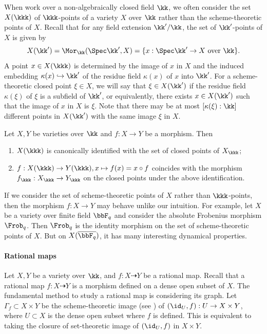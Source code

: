 When work over a non-algebraically closed field $\kk$, we often consider the set $X(\kkk)$ of $\kkk$-points of a variety $X$ over $\kk$ rather than the scheme-theoretic points of $X$.
Recall that for any field extension $\kk'/\kk$, the set of $\kk'$-points of $X$ is given by
\[ X(\kk') = \Mor_{\kk}(\Spec \kk', X) = \{ x: \Spec \kk' \to X \text{ over } \kk \}. \]
A point $x \in X(\kkk)$ is determined by the image of $x$ in $X$ and the induced embedding $\kappa(x) \hookrightarrow \kk'$ of the residue field $\kappa(x)$ of $x$ into $\kk'$.
For a scheme-theoretic closed point $\xi \in X$, we will say that $\xi \in X(\kk')$ if the residue field $\kappa(\xi)$ of $\xi$ is a subfield of $\kk'$, or equivalently, there exists $x \in X(\kk')$ such that the image of $x$ in $X$ is $\xi$.
Note that there may be at most $[\kappa(\xi):\kk]$ different points in $X(\kk')$ with the same image $\xi$ in $X$.
\begin{proposition}\label{prop:closed_points_on_varieties_over_non-algebraically_closed_fields}
	Let $X,Y$ be varieties over $\kk$ and $f: X \to Y$ be a morphism.
	Then
	\begin{enumerate}
		\item $X(\kkk)$ is canonically identified with the set of closed points of $X_\kkk$;
		\item $f: X(\kkk) \to Y(\kkk), x \mapsto f(x) = x \circ f$ coincides with the morphism $f_\kkk: X_\kkk \to Y_\kkk$ on the closed points under the above identification.
	\end{enumerate}
\end{proposition}
\begin{remark}
	If we consider the set of scheme-theoretic points of $X$ rather than $\kkk$-points, then the morphism $f: X \to Y$ may behave unlike our intuition.
	For example, let $X$ be a variety over finite field $\bbF_q$ and consider the absolute Frobenius morphism $\Frob_q$.
	Then $\Frob_q$ is the identity morphism on the set of scheme-theoretic points of $X$.
	But on $X(\overline{\bbF_q})$, it has many interesting dynamical properties.
\end{remark}

\paragraph{Rational maps}
Let $X,Y$ be a variety over $\kk$, and $f: X \dashrightarrow Y$ be a rational map.
Recall that a rational map $f: X \dashrightarrow Y$ is a morphism defined on a dense open subset of $X$.
The fundamental method to study a rational map is considering its graph.
Let $\Gamma_f \subset X \times Y$ be the scheme-theoretic image (see \cite[Tag 01R5]{Stacks}) of $(\id_U, f): U \to X \times Y$, where $U \subset X$ is the dense open subset where $f$ is defined.
This is equivalent to taking the closure of set-theoretic image of $(\id_U, f)$ in $X \times Y$.

